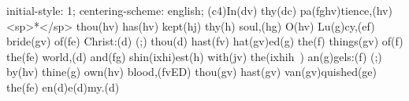 initial-style: 1;
centering-scheme: english;
(c4)In(dv) thy(dc) pa(fghv)tience,(hv) <sp>*</sp> thou(hv) has(hv) kept(hj) thy(h) soul,(hg) O(hv) Lu(g)cy,(ef) bride(gv) of(fe) Christ:(d) (;) thou(d) hast(fv) hat(gv)ed(g) the(f) things(gv) of(f) the(fe) world,(d) and(fg) shin(ixhi)est(h) with(jv) the(ixhih~) an(g)gels:(f) (;) by(hv) thine(g) own(hv) blood,(fvED) thou(gv) hast(gv) van(gv)quished(ge) the(fe) en(d)e(d)my.(d)
